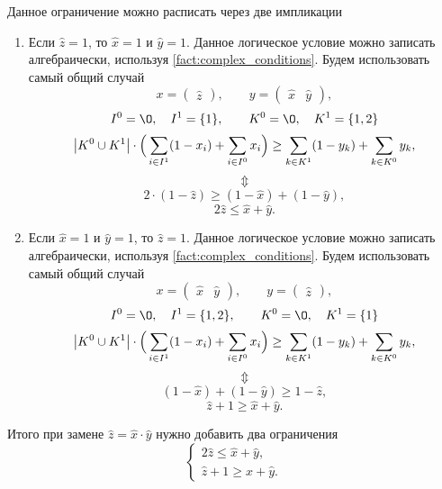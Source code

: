 Данное ограничение можно расписать через две импликации
\begin{enumerate}
	\item Если $\hat{z} = 1$, то $\hat{x} = 1$ и $\hat{y} = 1$. Данное логическое условие можно записать алгебраически, используя \cref{fact:complex_conditions}. Будем использовать самый общий случай
	\[
		x = \begin{pmatrix}\hat{z}\end{pmatrix}, \qquad y = \begin{pmatrix} \hat{x} & \hat{y} \end{pmatrix},
	\]
	\[
		I^0 = \O, \quad I^1 = \{1\}, \qquad K^0 = \O, \quad K^1 = \{1, 2\}
	\]
	\[
		\abs{K^0 \cup K^1} \cdot \Big(\sum_{i \in I^1}(1-x_i) + \sum_{i \in I^0}x_i\Big) \ge \sum_{k \in K^1}(1-y_k) + \sum_{k \in K^0}y_k,
	\]	
	\[\Updownarrow\]	
	\[
		2 \cdot (1 - \hat{z}) \ge (1 - \hat{x}) + (1 - \hat{y}),
	\]
	\[
		2\hat{z} \le \hat{x} + \hat{y}.
	\]
	
	\item Если $\hat{x} = 1$ и $\hat{y} = 1$, то $\hat{z} = 1$. Данное логическое условие можно записать алгебраически, используя \cref{fact:complex_conditions}. Будем использовать самый общий случай
	\[
		x = \begin{pmatrix}\hat{x} & \hat{y}\end{pmatrix}, \qquad y = \begin{pmatrix} \hat{z} \end{pmatrix},
	\]
	\[
		I^0 = \O, \quad I^1 = \{1, 2\}, \qquad K^0 = \O, \quad K^1 = \{1\}
	\]
	\[
		\abs{K^0 \cup K^1} \cdot \Big(\sum_{i \in I^1}(1-x_i) + \sum_{i \in I^0}x_i\Big) \ge \sum_{k \in K^1}(1-y_k) + \sum_{k \in K^0}y_k,
	\]
	\[\Updownarrow\]
	\[
		(1 - \hat{x}) + (1 - \hat{y}) \ge 1 - \hat{z},
	\]
	\[
		\hat{z} + 1 \ge \hat{x} + \hat{y}.
	\]
\end{enumerate}

Итого при замене $\hat{z} = \hat{x} \cdot \hat{y}$ нужно добавить два ограничения
\[
	\boxed{\begin{cases}
		2\hat{z} \le \hat{x} + \hat{y}, \\
			\hat{z} + 1 \ge \hat{x} + \hat{y}.
	\end{cases}}
\]
